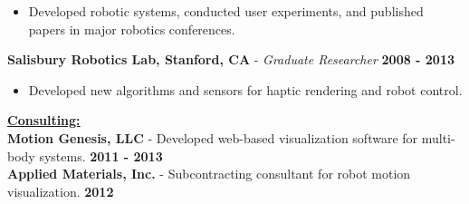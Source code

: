 \documentclass[line,margin]{res}
\newenvironment{compactlist}{
	\begin{itemize}\itemsep=0pt
}{
	\end{itemize}
}
\newcommand{\CVOnly}[1]{}
\newcommand{\CVOnly}[1]{#1}
\newcommand{\hide}[1]{}
\begin{document}
\begin{resume}
\begin{compactlist}
      \item Developed robotic systems, conducted user experiments,
        and published papers in major robotics conferences.
  \end{compactlist}
{\bf Salisbury Robotics Lab, Stanford, CA} - \emph{Graduate Researcher}
  \hfill \textbf{2008 - 2013}
  \begin{compactlist}
    \item Developed new algorithms and sensors for haptic rendering and robot control.
  \end{compactlist}
\CVOnly{
{\bf Electrical Engineering Intern} - Qual-Tron, Inc., Tulsa, OK
  \hfill \textbf{2006 - 2007}
  \begin{compactlist}
    \item Led redesign of a magnetic sensor product to reduce cost and simplify assembly.
  \end{compactlist}
}
%
\hide{
  \\[0.4pc]{\bf Summer Intern} - Atmel Corporation
    \hfill \textbf{Summer `05}
  \\[0.4pc]{\bf Summer Research Intern} - NASA Glenn Research Center
    \hfill \textbf{Summer `04}%
}
%
{\bf \underline{Consulting:}}
  {\\[0.2pc]{\bf Motion Genesis, LLC}
    - Developed web-based visualization software for multi-body systems.
      \hfill \textbf{2011 - 2013}}%
  {\\[0.0pc]{\bf Applied Materials, Inc.}
    - Subcontracting consultant for robot motion visualization.
      \hfill \textbf{2012}}%
%
%

\end{resume}
\end{document}
